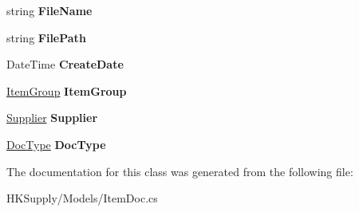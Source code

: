 \begin{DoxyCompactItemize}
\item 
\mbox{\label{class_h_k_supply_1_1_models_1_1_item_doc_a2945a39860b34a3f5042c19f788bb88a}} 
string {\bfseries File\+Name}
\item 
\mbox{\label{class_h_k_supply_1_1_models_1_1_item_doc_a356d83490cb2ed3b43897edb9fcfe16b}} 
string {\bfseries File\+Path}
\item 
\mbox{\label{class_h_k_supply_1_1_models_1_1_item_doc_a32dfac85f4e550ef5775e33981a4af83}} 
Date\+Time {\bfseries Create\+Date}
\item 
\mbox{\label{class_h_k_supply_1_1_models_1_1_item_doc_ae9d06f36c4065e26052db0c9e3f7fd7c}} 
\mbox{\hyperlink{class_h_k_supply_1_1_models_1_1_item_group}{Item\+Group}} {\bfseries Item\+Group}
\item 
\mbox{\label{class_h_k_supply_1_1_models_1_1_item_doc_a66d671b5154d0bc55166d57b451abb56}} 
\mbox{\hyperlink{class_h_k_supply_1_1_models_1_1_supplier}{Supplier}} {\bfseries Supplier}
\item 
\mbox{\label{class_h_k_supply_1_1_models_1_1_item_doc_added22ce757c8c718739cdc11e297690}} 
\mbox{\hyperlink{class_h_k_supply_1_1_models_1_1_doc_type}{Doc\+Type}} {\bfseries Doc\+Type}
\end{DoxyCompactItemize}


The documentation for this class was generated from the following file\+:\begin{DoxyCompactItemize}
\item 
H\+K\+Supply/\+Models/Item\+Doc.\+cs\end{DoxyCompactItemize}
